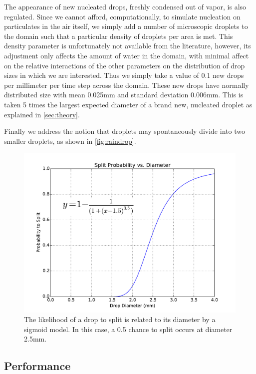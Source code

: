 \documentclass[twocolumn,a4paper,10pt]{article}
\begin{document}
The appearance of new nucleated drops, freshly condensed out of vapor, is also
regulated. Since we cannot afford, computationally, to simulate nucleation on
particulates in the air itself, we simply add a number of microscopic droplets
to the domain such that a particular density of droplets per area is met. This
density parameter is unfortunately not available from the literature, however,
its adjustment only affects the amount of water in the domain, with minimal
affect on the relative interactions of the other parameters on the distribution
of drop sizes in which we are interested. Thus we simply take a value of 0.1 new
drops per millimeter per time step across the domain. These new drops have
normally distributed size with mean 0.025mm and standard deviation 0.006mm. This
is taken 5 times the largest expected diameter of a brand new, nucleated droplet
as explained in \autoref{sec:theory}.

Finally we address the notion that droplets may spontaneously divide into two
smaller droplets, as shown in \autoref{fig:raindrop}. 

\begin{figure}[h]
    \centering
    \includegraphics[width=\linewidth]{split_distribution}
    \caption{The likelihood of a drop to split is related to its diameter by a
    sigmoid model. In this case, a 0.5 chance to split occurs at diameter 2.5mm.}
    \label{fig:split_distribution}
\end{figure}


\subsection{Performance}
\end{document}
